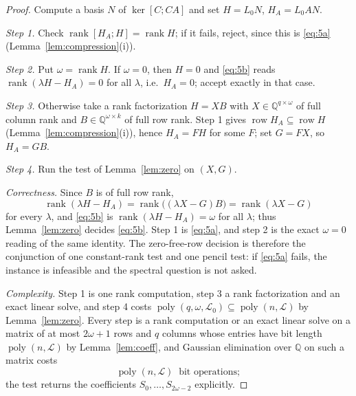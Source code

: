 \begin{proof}
Compute a basis $N$ of $\ker[C;CA]$ and set $H=L_0N$, $H_A=L_0AN$.

\emph{Step 1.} Check $\operatorname{rank}[H_A;H]=\operatorname{rank}H$; if it
fails, reject, since this is \eqref{eq:5a}
(Lemma~\ref{lem:compression}(i)).

\emph{Step 2.} Put $\omega=\operatorname{rank}H$. If $\omega=0$, then $H=0$ and
\eqref{eq:5b} reads $\operatorname{rank}(\lambda H-H_A)=0$ for all $\lambda$,
i.e.\ $H_A=0$; accept exactly in that case.

\emph{Step 3.} Otherwise take a rank factorization $H=XB$ with
$X\in\mathbb Q^{q\times\omega}$ of full column rank and
$B\in\mathbb Q^{\omega\times k}$ of full row rank. Step 1 gives
$\operatorname{row}H_A\subseteq\operatorname{row}H$
(Lemma~\ref{lem:compression}(i)), hence $H_A=FH$ for some $F$; set $G=FX$, so
$H_A=GB$.

\emph{Step 4.} Run the test of Lemma~\ref{lem:zero} on $(X,G)$.

\emph{Correctness.} Since $B$ is of full row rank,
\begin{equation*}
\operatorname{rank}(\lambda H-H_A)
=\operatorname{rank}\bigl((\lambda X-G)B\bigr)
=\operatorname{rank}(\lambda X-G)
\end{equation*}
for every $\lambda$, and \eqref{eq:5b} is
$\operatorname{rank}(\lambda H-H_A)=\omega$ for all $\lambda$; thus
Lemma~\ref{lem:zero} decides \eqref{eq:5b}. Step 1 is \eqref{eq:5a}, and step 2
is the exact $\omega=0$ reading of the same identity. The zero-free-row decision
is therefore the conjunction of one constant-rank test and one pencil test: if
\eqref{eq:5a} fails, the instance is infeasible and the spectral question is not
asked.

\emph{Complexity.} Step 1 is one rank computation, step 3 a rank factorization
and an exact linear solve, and step 4 costs
$\operatorname{poly}(q,\omega,\mathcal L_0)\subseteq\operatorname{poly}(n,\mathcal L)$
by Lemma~\ref{lem:zero}. Every step is a rank computation or an exact linear
solve on a matrix of at most $2\omega+1$ rows and $q$ columns whose entries have
bit length $\operatorname{poly}(n,\mathcal L)$ by Lemma~\ref{lem:coeff}, and
Gaussian elimination over $\mathbb Q$ on such a matrix costs
\begin{equation*}
\operatorname{poly}(n,\mathcal L)\ \text{ bit operations};
\end{equation*}
the test returns the coefficients $S_0,\dots,S_{2\omega-2}$ explicitly.
\end{proof}

